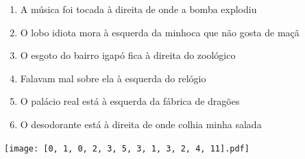 \documentclass[12pt]{article}
\begin{document}
		 

\pagebreak


	\begin{enumerate}
		  \sffamily %
		  \large %


\vfill \item
A música foi tocada	%
à direita
de onde a bomba explodiu	%

\vfill \item
O lobo idiota mora	%
à esquerda
da minhoca que não gosta de maçã	%

\vfill \item
O esgoto do bairro igapó fica	%
à direita
do zoológico	%

\vfill \item
Falavam mal sobre ela	%
à esquerda
do relógio	%

\vfill \item
O palácio real está	%
à esquerda
da fábrica de dragões	%

\vfill \item
O desodorante está	%
à direita
de onde colhia minha salada	%
	\end{enumerate}
		  
		  \hfill

		  \vfill

\texttt{[image: [0, 1, 0, 2, 3, 5, 3, 1, 3, 2, 4, 11].pdf]}


	\hfill	  	  


\pagebreak			
\end{document}
